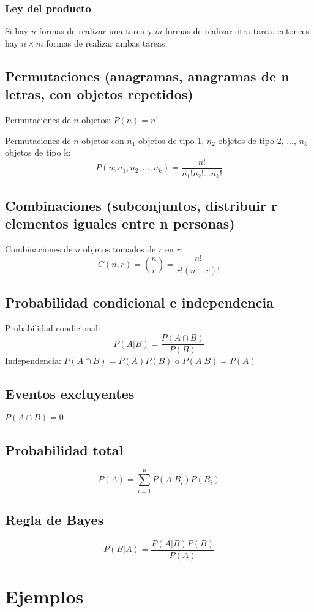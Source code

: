 \documentclass[letterpaper, 12pt]{article}
\begin{document}
	\subsubsection{Ley del producto}
	Si hay $n$ formas de realizar una tarea y $m$ formas de realizar otra tarea, entonces hay $n \times m$ formas de realizar ambas tareas.
	
	\subsection{Permutaciones (anagramas, anagramas de n letras, con objetos repetidos)}
	Permutaciones de $n$ objetos: $P(n) = n!$
	
	\noindent Permutaciones de $n$ objetos con $n_1$ objetos de tipo 1, $n_2$ objetos de tipo 2, ..., $n_k$ objetos de tipo k:
	$$P(n; n_1, n_2, ..., n_k) = \frac{n!}{n_1! n_2! ... n_k!}$$
	
	\subsection{Combinaciones (subconjuntos, distribuir r elementos iguales entre n personas)}
	Combinaciones de $n$ objetos tomados de $r$ en $r$:
	$$C(n, r) = \binom{n}{r} = \frac{n!}{r!(n-r)!}$$
	
	\subsection{Probabilidad condicional e independencia}
	Probabilidad condicional:
	$$P(A|B) = \frac{P(A \cap B)}{P(B)}$$
	Independencia: $P(A \cap B) = P(A)P(B)$ o $P(A|B) = P(A)$
	
	\subsection{Eventos excluyentes}
	$P(A \cap B) = 0$
	
	\subsection{Probabilidad total}
	$$P(A) = \sum_{i=1}^{n} P(A|B_i)P(B_i)$$
	
	\subsection{Regla de Bayes}
	$$P(B|A) = \frac{P(A|B)P(B)}{P(A)}$$
	
	\section{Ejemplos}
	
\end{document}

